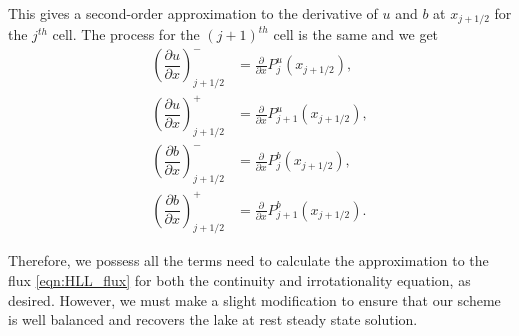 This gives a second-order approximation to the derivative of $u$ and $b$ at $x_{j+1/2}$ for the $j^{th}$ cell. The process for the $(j+1)^{th}$ cell is the same and we get 
\begin{subequations}
	\begin{align}
	\left(\dfrac{\partial {u}}{\partial x} \right)^-_{j + 1/2} &= \frac{\partial }{\partial x}P^u_j(x_{j+1/2}),  \\
	\left(\dfrac{\partial {u}}{\partial x} \right)^+_{j + 1/2} &= \frac{\partial }{\partial x}P^u_{j+1}(x_{j+1/2}),  \\
	\left(\dfrac{\partial {b}}{\partial x} \right)^-_{j + 1/2} &= \frac{\partial }{\partial x}P^b_j(x_{j+1/2}), \\
	\left(\dfrac{\partial {b}}{\partial x} \right)^+_{j + 1/2} &= \frac{\partial }{\partial x}P^b_{j+1}(x_{j+1/2}). 	\end{align}
	\label{eqn:dbduRecon}
\end{subequations}

Therefore, we possess all the terms need to calculate the approximation to the flux \eqref{eqn:HLL_flux} for both the continuity and irrotationality equation, as desired. However, we must make a slight modification to ensure that our scheme is well balanced and recovers the lake at rest steady state solution.

